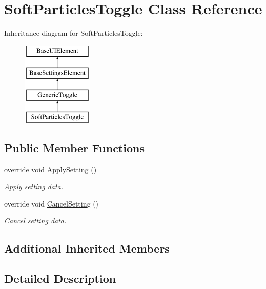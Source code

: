 \hypertarget{class_soft_particles_toggle}{}\section{Soft\+Particles\+Toggle Class Reference}
\label{class_soft_particles_toggle}
Inheritance diagram for Soft\+Particles\+Toggle\+:\begin{figure}[H]
\begin{center}
\leavevmode
\includegraphics[height=4.000000cm]{class_soft_particles_toggle}
\end{center}
\end{figure}
\subsection*{Public Member Functions}
\begin{DoxyCompactItemize}
\item 
override void \hyperlink{class_soft_particles_toggle_a19138a1f7285d6d416ef7b62a3176e9e}{Apply\+Setting} ()
\begin{DoxyCompactList}\small\item\em Apply setting data. \end{DoxyCompactList}\item 
override void \hyperlink{class_soft_particles_toggle_a60520a7db08f28059e7407110749c2f6}{Cancel\+Setting} ()
\begin{DoxyCompactList}\small\item\em Cancel setting data. \end{DoxyCompactList}\end{DoxyCompactItemize}
\subsection*{Additional Inherited Members}


\subsection{Detailed Description}


